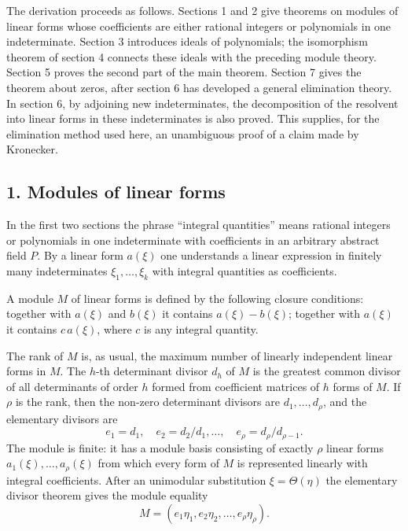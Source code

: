\documentclass[12pt]{article}
\begin{document}
The derivation proceeds as follows. Sections 1 and 2 give theorems on modules of linear forms whose coefficients are either rational integers or polynomials in one indeterminate. Section 3 introduces ideals of polynomials; the isomorphism theorem of section 4 connects these ideals with the preceding module theory. Section 5 proves the second part of the main theorem. Section 7 gives the theorem about zeros, after section 6 has developed a general elimination theory. In section 6, by adjoining new indeterminates, the decomposition of the resolvent into linear forms in these indeterminates is also proved. This supplies, for the elimination method used here, an unambiguous proof of a claim made by Kronecker.

\subsection{1. Modules of linear forms}

In the first two sections the phrase ``integral quantities'' means rational integers or polynomials in one indeterminate with coefficients in an arbitrary abstract field $P$. By a linear form $a(\xi)$ one understands a linear expression in finitely many indeterminates $\xi_1,\ldots,\xi_k$ with integral quantities as coefficients.

A module $M$ of linear forms is defined by the following closure conditions: together with $a(\xi)$ and $b(\xi)$ it contains $a(\xi)-b(\xi)$; together with $a(\xi)$ it contains $c\,a(\xi)$, where $c$ is any integral quantity.

The rank of $M$ is, as usual, the maximum number of linearly independent linear forms in $M$. The $h$-th determinant divisor $d_h$ of $M$ is the greatest common divisor of all determinants of order $h$ formed from coefficient matrices of $h$ forms of $M$. If $\rho$ is the rank, then the non-zero determinant divisors are $d_1,\ldots,d_\rho$, and the elementary divisors are
\[
  e_1=d_1,
  \quad e_2=d_2/d_1,
  \ldots,
  \quad e_\rho=d_\rho/d_{\rho-1}.
\]
The module is finite: it has a module basis consisting of exactly $\rho$ linear forms $a_1(\xi),\ldots,a_\rho(\xi)$ from which every form of $M$ is represented linearly with integral coefficients. After an unimodular substitution $\xi=\Theta(\eta)$ the elementary divisor theorem gives the module equality
\begin{equation}
  M=(e_1\eta_1,e_2\eta_2,\ldots,e_\rho\eta_\rho).                  \tag{1}
\end{equation}
\end{document}
